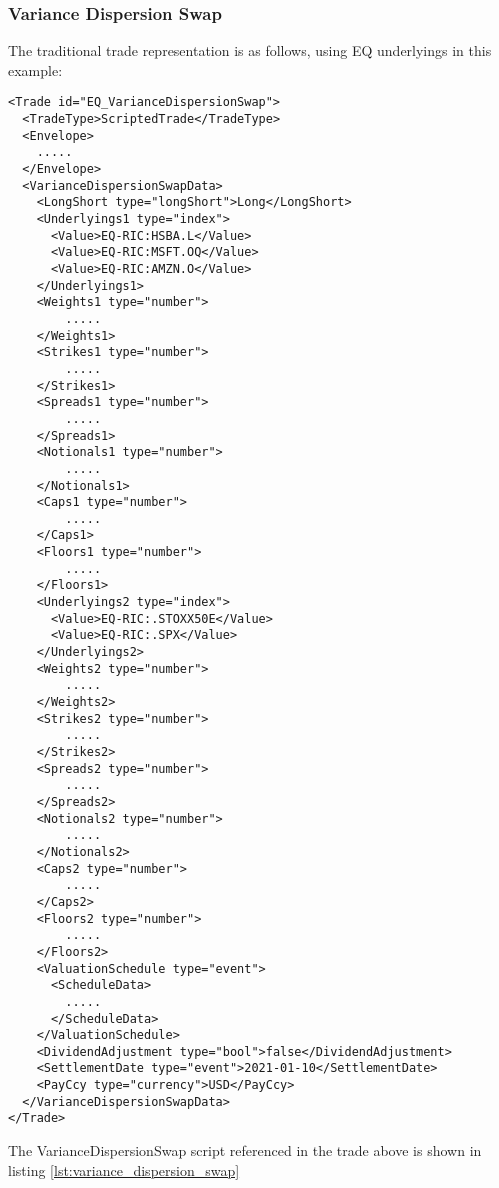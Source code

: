 \subsubsection*{Variance Dispersion Swap}

The traditional trade representation is as follows, using EQ underlyings in this example:

\begin{verbatim}
<Trade id="EQ_VarianceDispersionSwap">
  <TradeType>ScriptedTrade</TradeType>
  <Envelope>
    .....
  </Envelope>
  <VarianceDispersionSwapData>
    <LongShort type="longShort">Long</LongShort>
    <Underlyings1 type="index">
      <Value>EQ-RIC:HSBA.L</Value>
      <Value>EQ-RIC:MSFT.OQ</Value>
      <Value>EQ-RIC:AMZN.O</Value>
    </Underlyings1>
    <Weights1 type="number">
        .....
    </Weights1>
    <Strikes1 type="number">
        .....
    </Strikes1>
    <Spreads1 type="number">
        .....
    </Spreads1>
    <Notionals1 type="number">
        .....
    </Notionals1>
    <Caps1 type="number">
        .....
    </Caps1>
    <Floors1 type="number">
        .....
    </Floors1>
    <Underlyings2 type="index">
      <Value>EQ-RIC:.STOXX50E</Value>
      <Value>EQ-RIC:.SPX</Value>
    </Underlyings2>
    <Weights2 type="number">
        .....
    </Weights2>
    <Strikes2 type="number">
        .....
    </Strikes2>
    <Spreads2 type="number">
        .....
    </Spreads2>
    <Notionals2 type="number">
        .....
    </Notionals2>
    <Caps2 type="number">
        .....
    </Caps2>
    <Floors2 type="number">
        .....
    </Floors2>
    <ValuationSchedule type="event">
      <ScheduleData>
        .....
      </ScheduleData>
    </ValuationSchedule>
    <DividendAdjustment type="bool">false</DividendAdjustment>
    <SettlementDate type="event">2021-01-10</SettlementDate>
    <PayCcy type="currency">USD</PayCcy>
  </VarianceDispersionSwapData>
</Trade>
\end{verbatim}

The VarianceDispersionSwap script referenced in the trade above is shown in listing
\ref{lst:variance_dispersion_swap}

